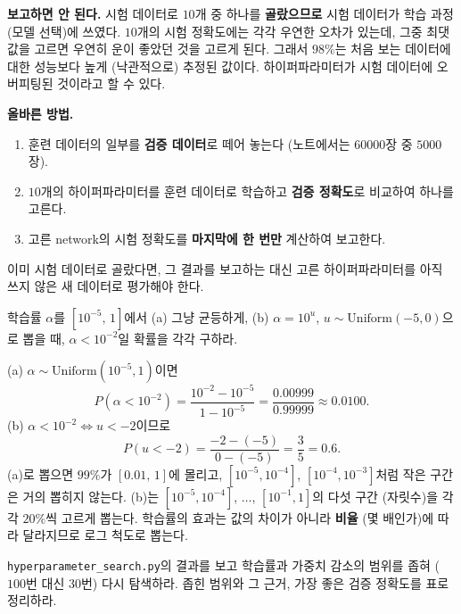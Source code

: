 \documentclass[11pt,a4paper]{article}
\begin{document}
\begin{problems}
\begin{sol}
\textbf{보고하면 안 된다.}
시험 데이터로 $10$개 중 하나를 \textbf{골랐으므로} 시험 데이터가 학습 과정 (모델 선택)에 쓰였다.
$10$개의 시험 정확도에는 각각 우연한 오차가 있는데, 그중 최댓값을 고르면 우연히 운이 좋았던 것을 고르게 된다.
그래서 $98\%$는 처음 보는 데이터에 대한 성능보다 높게 (낙관적으로) 추정된 값이다.
하이퍼파라미터가 시험 데이터에 오버피팅된 것이라고 할 수 있다.

\textbf{올바른 방법.}
\begin{enumerate}[label=(\arabic*),leftmargin=2em,itemsep=1pt]
\item 훈련 데이터의 일부를 \textbf{검증 데이터}로 떼어 놓는다 (노트에서는 $60000$장 중 $5000$장).
\item $10$개의 하이퍼파라미터를 훈련 데이터로 학습하고 \textbf{검증 정확도}로 비교하여 하나를 고른다.
\item 고른 network의 시험 정확도를 \textbf{마지막에 한 번만} 계산하여 보고한다.
\end{enumerate}
이미 시험 데이터로 골랐다면, 그 결과를 보고하는 대신 고른 하이퍼파라미터를 아직 쓰지 않은 새 데이터로 평가해야 한다.
\end{sol}

\item 학습률 $\alpha$를 $[10^{-5},\,1]$에서 (a) 그냥 균등하게, (b) $\alpha=10^{u}$, $u\sim\mathrm{Uniform}(-5,0)$으로 뽑을 때,
$\alpha<10^{-2}$일 확률을 각각 구하라.

\begin{sol}
(a) $\alpha\sim\mathrm{Uniform}(10^{-5},1)$이면
\[
P(\alpha<10^{-2})=\frac{10^{-2}-10^{-5}}{1-10^{-5}}=\frac{0.00999}{0.99999}\approx\boxed{0.0100}.
\]
(b) $\alpha<10^{-2}\iff u<-2$이므로
\[
P(u<-2)=\frac{-2-(-5)}{0-(-5)}=\boxed{\frac35=0.6}.
\]
(a)로 뽑으면 $99\%$가 $[0.01,\,1]$에 몰리고, $[10^{-5},10^{-4}]$, $[10^{-4},10^{-3}]$처럼 작은 구간은 거의 뽑히지 않는다.
(b)는 $[10^{-5},10^{-4}]$, $\ldots$, $[10^{-1},1]$의 다섯 구간 (자릿수)을 각각 $20\%$씩 고르게 뽑는다.
학습률의 효과는 값의 차이가 아니라 \textbf{비율} (몇 배인가)에 따라 달라지므로 로그 척도로 뽑는다.
\end{sol}

\item \texttt{hyperparameter\_search.py}의 결과를 보고 학습률과 가중치 감소의 범위를 좁혀
($100$번 대신 $30$번) 다시 탐색하라. 좁힌 범위와 그 근거, 가장 좋은 검증 정확도를 표로 정리하라.


\end{problems}
\end{document}
